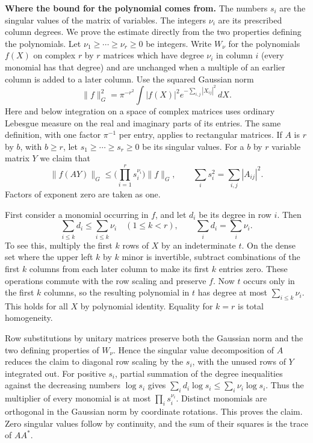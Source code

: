 \documentclass[11pt,letterpaper]{article}
\begin{document}
\textbf{Where the bound for the polynomial comes from.}
The numbers $s_i$ are the singular values of the matrix of variables.
The integers $\nu_i$ are its prescribed column degrees. We prove the
estimate directly from the two properties defining the polynomials.
Let $\nu_1\ge\cdots\ge\nu_r\ge0$ be integers. Write $W_\nu$ for the
polynomials $f(X)$ on complex $r$ by $r$ matrices which have degree
$\nu_i$ in column $i$ (every monomial has that degree) and are unchanged
when a multiple of an earlier column is added to a later column.
Use the squared Gaussian norm
\begin{equation}\label{D:151}
 \|f\|_G^2=\pi^{-r^2}\int |f(X)|^2 e^{-\sum_{i,j}|X_{ij}|^2}\,dX .
\end{equation}
Here and below integration on a space of complex matrices uses ordinary
Lebesgue measure on the real and imaginary parts of its entries.
The same definition, with one factor $\pi^{-1}$ per entry, applies to
rectangular matrices. If $A$ is $r$ by $b$, with $b\ge r$, let
$s_1\ge\cdots\ge s_r\ge0$ be its singular values. For a $b$ by $r$
variable matrix $Y$ we claim that
\begin{equation}\label{D:152}
       \|f(AY)\|_G\le\Big(\prod_{i=1}^r s_i^{\nu_i}\Big)\|f\|_G,
       \qquad \sum_i s_i^2=\sum_{i,j}|A_{ij}|^2 .
\end{equation}
Factors of exponent zero are taken as one.

First consider a monomial occurring in $f$, and let $d_i$ be its
degree in row $i$. Then
\begin{equation}\label{D:153}
 \sum_{i\le k}d_i\le\sum_{i\le k}\nu_i\quad(1\le k<r),\qquad
 \sum_i d_i=\sum_i\nu_i .
\end{equation}
To see this, multiply the first $k$ rows of $X$ by an indeterminate $t$.
On the dense set where the upper left $k$ by $k$ minor is invertible,
subtract combinations of the first $k$ columns from each later column
to make its first $k$ entries zero. These operations commute with the row
scaling and preserve $f$. Now $t$ occurs only in the first $k$ columns,
so the resulting polynomial in $t$ has degree at most $\sum_{i\le k}\nu_i$.
This holds for all $X$ by polynomial identity. Equality for $k=r$ is
total homogeneity.

Row substitutions by unitary matrices preserve both the Gaussian norm
and the two defining properties of $W_\nu$. Hence the singular value
decomposition of $A$ reduces the claim to diagonal row scaling by the
$s_i$, with the unused rows of $Y$ integrated out. For positive $s_i$,
partial summation of the degree inequalities against the decreasing
numbers $\log s_i$ gives $\sum_i d_i\log s_i\le\sum_i\nu_i\log s_i$.
Thus the multiplier of every monomial is at most $\prod_i s_i^{\nu_i}$.
Distinct monomials are orthogonal in the Gaussian norm by coordinate
rotations. This proves the claim. Zero singular values follow by
continuity, and the sum of their squares is the trace of $AA^*$.
\end{document}
